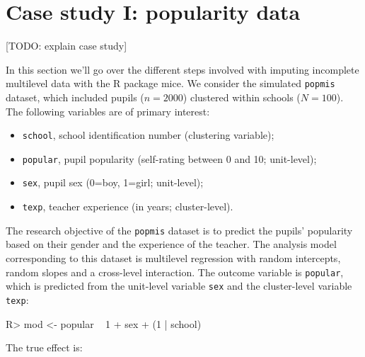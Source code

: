 \documentclass[
]{jss}
\providecommand{\tightlist}{%
  \setlength{\itemsep}{0pt}\setlength{\parskip}{0pt}}
\begin{document}
\hypertarget{case-study-i-popularity-data}{%
\section{Case study I: popularity
data}\label{case-study-i-popularity-data}}

{[}TODO: explain case study{]}

In this section we'll go over the different steps involved with imputing
incomplete multilevel data with the R package mice. We consider the
simulated \texttt{popmis} dataset, which included pupils (\(n = 2000\))
clustered within schools (\(N = 100\)). The following variables are of
primary interest:

\begin{itemize}
\tightlist
\item
  \texttt{school}, school identification number (clustering variable);
\item
  \texttt{popular}, pupil popularity (self-rating between 0 and 10;
  unit-level);
\item
  \texttt{sex}, pupil sex (0=boy, 1=girl; unit-level);
\item
  \texttt{texp}, teacher experience (in years; cluster-level).
\end{itemize}

The research objective of the \texttt{popmis} dataset is to predict the
pupils' popularity based on their gender and the experience of the
teacher. The analysis model corresponding to this dataset is multilevel
regression with random intercepts, random slopes and a cross-level
interaction. The outcome variable is \texttt{popular}, which is
predicted from the unit-level variable \texttt{sex} and the
cluster-level variable \texttt{texp}:

\begin{CodeChunk}
\begin{CodeInput}
R> mod <- popular ~ 1 + sex + (1 | school)
\end{CodeInput}
\end{CodeChunk}

The true effect is:
\end{document}
